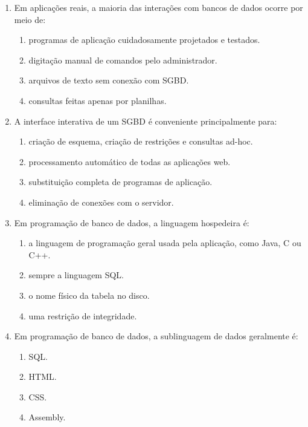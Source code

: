 \documentclass[12pt,a4paper]{article}
\begin{document}
\begin{enumerate}[label=\textbf{Q\arabic*.}]

\item Em aplicações reais, a maioria das interações com bancos de dados ocorre por meio de:

\begin{enumerate}[label=\alph*)]
    \item programas de aplicação cuidadosamente projetados e testados.
    \item digitação manual de comandos pelo administrador.
    \item arquivos de texto sem conexão com SGBD.
    \item consultas feitas apenas por planilhas.
\end{enumerate}

\item A interface interativa de um SGBD é conveniente principalmente para:

\begin{enumerate}[label=\alph*)]
    \item criação de esquema, criação de restrições e consultas ad-hoc.
    \item processamento automático de todas as aplicações web.
    \item substituição completa de programas de aplicação.
    \item eliminação de conexões com o servidor.
\end{enumerate}

\item Em programação de banco de dados, a linguagem hospedeira é:

\begin{enumerate}[label=\alph*)]
    \item a linguagem de programação geral usada pela aplicação, como Java, C ou C++.
    \item sempre a linguagem SQL.
    \item o nome físico da tabela no disco.
    \item uma restrição de integridade.
\end{enumerate}

\item Em programação de banco de dados, a sublinguagem de dados geralmente é:

\begin{enumerate}[label=\alph*)]
    \item SQL.
    \item HTML.
    \item CSS.
    \item Assembly.
\end{enumerate}


\end{enumerate}
\end{document}
